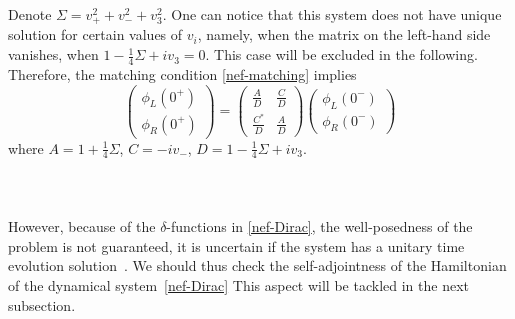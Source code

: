 Denote $\Sigma = v_+ ^ 2 + v_- ^ 2 + v_3 ^ 2$.
One can notice that this system does not have unique solution for certain values of $v_i$, namely, when the matrix on the left-hand side vanishes, \ie when $1 - \frac{1}{4}\Sigma + iv_3 = 0$. This case will be excluded in the following.
Therefore, the matching condition \cref{nef-matching} implies 
\begin{equation}\label{nef-matching2}
\begin{pmatrix}
\phi_L(0^+) \\
\phi_R(0^+)
\end{pmatrix} = \begin{pmatrix}
\frac{A}{D}  & \frac{C}{D} \\
\frac{C^*}{D} & \frac{A}{D}
\end{pmatrix}\begin{pmatrix}
\phi_L(0^-) \\
\phi_R(0^-)
\end{pmatrix}
\end{equation}
where $A = 1+ \frac{1}{4}\Sigma$, $C = -iv_-$, $D = 1-\frac{1}{4}\Sigma + iv_3$.
%
\\\\
%
%

%
\\\\
However, because of the $\delta$-functions in \cref{nef-Dirac}, 
the well-posedness of the problem is not guaranteed,
\ie it is uncertain if the system has a unitary time evolution solution~\cite{Reed1981}.
We should thus check the self-adjointness of the Hamiltonian of the dynamical system~\cref{nef-Dirac}
This aspect will be tackled in the next subsection.
%



%
%
%
%


















